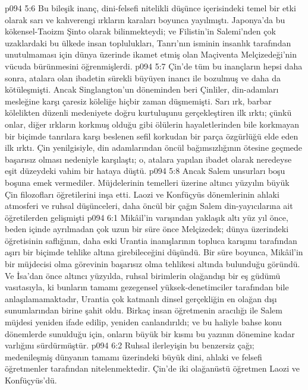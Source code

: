 \vs p094 5:6 Bu bileşik inanç, dini\hyp{}felsefi nitelikli düşünce içerisindeki temel bir etki olarak sarı ve kahverengi ırkların karaları boyunca yayılmıştı. Japonya’da bu kökensel\hyp{}Taoizm Şinto olarak bilinmekteydi; ve Filistin’in Salemi’nden çok uzaklardaki bu ülkede insan toplulukları, Tanrı’nın isminin insanlık tarafından unutulmaması için dünya üzerinde ikamet etmiş olan Maçiventa Melçizedeği’nin vücuda bürünmesini öğrenmişlerdi.
\vs p094 5:7 Çin’de tüm bu inançların hepsi daha sonra, atalara olan ibadetin sürekli büyüyen inancı ile bozulmuş ve daha da kötüleşmişti. Ancak Singlangton’un döneminden beri Çinliler, din\hyp{}adamları mesleğine karşı çaresiz köleliğe hiçbir zaman düşmemişti. Sarı ırk, barbar kölelikten düzenli medeniyete doğru kurtuluşunu gerçekleştiren ilk ırktı; çünkü onlar, diğer ırkların korkmuş olduğu gibi ölülerin hayaletlerinden bile korkmayan bir biçimde tanrılara karşı beslenen sefil korkudan bir parça özgürlüğü elde eden ilk ırktı. Çin yenilgisiyle, din adamlarından öncül bağımsızlığının ötesine geçmede başarısız olması nedeniyle karşılaştı; o, atalara yapılan ibadet olarak neredeyse eşit düzeydeki vahim bir hataya düştü.
\vs p094 5:8 Ancak Salem unsurları boşu boşuna emek vermediler. Müjdelerinin temelleri üzerine altıncı yüzyılın büyük Çin filozofları öğretilerini inşa etti. Laozi ve Konfüçyüs dönemlerinin ahlaki atmosferi ve ruhsal düşünceleri, daha öncül bir çağın Salem din\hyp{}yayıcılarına ait öğretilerden gelişmişti
\vs p094 6:1 Mikâil’in varışından yaklaşık altı yüz yıl önce, beden içinde ayrılmadan çok uzun bir süre önce Melçizedek; dünya üzerindeki öğretisinin saflığının, daha eski Urantia inanışlarının topluca karışımı tarafından aşırı bir biçimde tehlike altına girebileceğini düşündü. Bir süre boyunca, Mikâil’in bir müjdecisi olma görevinin başarısız olma tehlikesi altında bulunduğu göründü. Ve İsa’dan önce altıncı yüzyılda, ruhsal birimlerin olağandışı bir eş güdümü vasıtasıyla, ki bunların tamamı gezegensel yüksek\hyp{}denetimciler tarafından bile anlaşılamamaktadır, Urantia çok katmanlı dinsel gerçekliğin en olağan dışı sunumlarından birine şahit oldu. Birkaç insan öğretmenin aracılığı ile Salem müjdesi yeniden ifade edilip, yeniden canlandırıldı; ve bu haliyle bahse konu dönemlerde sunulduğu için, onların büyük bir kısmı bu yazının dönemine kadar varlığını sürdürmüştür.
\vs p094 6:2 Ruhsal ilerleyişin bu benzersiz çağı; medenileşmiş dünyanın tamamı üzerindeki büyük dini, ahlaki ve felsefi öğretmenler tarafından nitelenmektedir. Çin’de iki olağanüstü öğretmen Laozi ve Konfüçyüs’dü.

